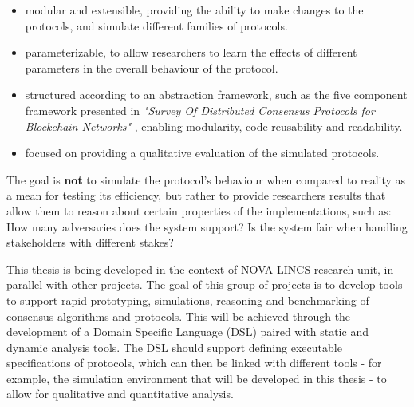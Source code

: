 \begin{itemize}
  \item modular and extensible, providing the ability to make changes to the protocols, and simulate different families of protocols.
  \item parameterizable, to allow researchers to learn the effects of different parameters in the overall behaviour of the protocol.
  \item structured according to an abstraction framework, such as the five component framework presented in \textit{"Survey Of Distributed Consensus Protocols for Blockchain Networks"} \cite{survey_bchain_networks}, enabling modularity, code reusability and readability.
  \item focused on providing a qualitative evaluation of the simulated protocols.
\end{itemize}

The goal is \textbf{not} to simulate the protocol's behaviour when compared to reality as a mean for testing its efficiency, but rather to provide researchers results that allow them to reason about certain properties of the implementations, such as: How many adversaries does the system support? Is the system fair when handling stakeholders with different stakes?

\vspace{0.5cm}

This thesis is being developed in the context of NOVA LINCS research unit, in parallel with other projects. The goal of this group of projects is to develop tools to support rapid prototyping, simulations, reasoning and benchmarking of consensus algorithms and protocols. This will be achieved through the development of a Domain Specific Language (DSL) paired with static and dynamic analysis tools. The DSL should support defining executable specifications of protocols, which can then be linked with different tools - for example, the simulation environment that will be developed in this thesis - to allow for qualitative and quantitative analysis.



